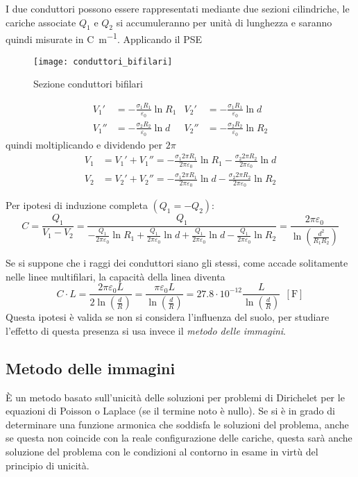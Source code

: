 I due conduttori possono essere rappresentati mediante due sezioni cilindriche,
le cariche associate $Q_1$ e $Q_2$ si accumuleranno per unità di lunghezza e 
saranno quindi misurate in \si{\coulomb\per\meter}.
Applicando il PSE
\begin{figure}[h!]
\centering
 \texttt{[image: conduttori\_bifilari]}
\caption{Sezione conduttori bifilari}
\end{figure} 

\begin{align*}
V_1' &= -\frac{\sigma_1 R_1}{\varepsilon_0} \ln R_1 & V_2' &= -\frac{\sigma_1 R_1}{\varepsilon_0} \ln d\\
V_1'' &= -\frac{\sigma_2 R_2}{\varepsilon_0} \ln d & V_2'' &= -\frac{\sigma_2 R_2}{\varepsilon_0} \ln R_2
\end{align*}
quindi moltiplicando e dividendo per $2\pi$
\begin{align*}
V_1 &= V_1' + V_1'' = -\frac{\sigma_1 2\pi R_1}{2\pi\varepsilon_0} \ln R_1 -\frac{\sigma_2 2\pi R_2}{2\pi\varepsilon_0} \ln d\\
V_2 &= V_2' + V_2'' = -\frac{\sigma_1 2\pi R_1}{2\pi\varepsilon_0} \ln d  -\frac{\sigma_2 2\pi R_2}{2\pi\varepsilon_0} \ln R_2
\end{align*}

Per ipotesi di induzione completa $(Q_1 = - Q_2)$:
$$
C = \frac{Q_1}{V_1-V_2} = \frac{Q_1}{-\frac{Q_1}{2\pi\varepsilon_0}\ln R_1 + \frac{Q_1}{2\pi\varepsilon_0}\ln d + \frac{Q_1}{2\pi\varepsilon_0}\ln d - \frac{Q_1}{2 \pi \varepsilon_0} \ln R_2} = \frac{2\pi\varepsilon_0}{\ln \left(\frac{d^2}{R_1R_2}\right)}
$$

Se si suppone che i raggi dei conduttori siano gli stessi, come accade solitamente nelle linee multifilari, la capacità della linea diventa
$$
C\cdot L = \frac{2\pi\varepsilon_0 L}{2 \ln \left(\frac{d}{R}\right)} = \frac{\pi \varepsilon_0 L}{\ln \left(\frac{d}{R}\right)} = 27.8\cdot 10^{-12} \frac{L}{\ln\left(\frac{d}{R}\right)}\ \ [\si{\farad}]
$$
Questa ipotesi è valida se non si considera l'influenza del suolo, per studiare l'effetto di questa 
presenza si usa invece il \textit{metodo delle immagini}.

\subsection{Metodo delle immagini}
È un metodo basato sull'unicità delle soluzioni per problemi di Dirichelet per le equazioni di
Poisson o Laplace (se il termine noto è nullo). Se si è in grado di determinare una funzione
armonica che soddisfa le soluzioni del problema, anche se questa non coincide con la reale 
configurazione delle cariche, questa sarà anche soluzione del problema con le condizioni al contorno
in esame in virtù del principio di unicità.

